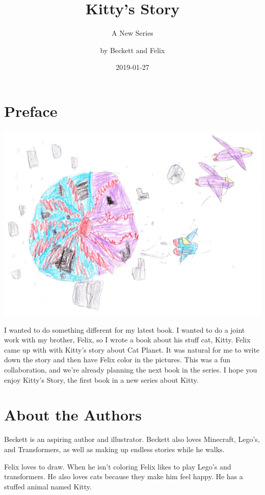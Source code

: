 \documentclass[12pt,oneside]{krantz}
\title{Kitty's Story}
\subtitle{A New Series}
\author{by Beckett and Felix}
\date{2019-01-27}
\begin{document}
\maketitle

{
\setcounter{tocdepth}{1}
\tableofcontents
}
\hypertarget{preface}{%
\chapter*{Preface}\label{preface}}


\includegraphics{img/catplanet.jpg}

I wanted to do something different for my latest book. I wanted to do a
joint work with my brother, Felix, so I wrote a book about his stuff
cat, Kitty. Felix came up with with Kitty's story about Cat Planet. It
was natural for me to write down the story and then have Felix color in
the pictures. This was a fun collaboration, and we're already planning
the next book in the series. I hope you enjoy Kitty's Story, the first
book in a new series about Kitty.

\hypertarget{about-the-authors}{%
\chapter*{About the Authors}\label{about-the-authors}}


Beckett is an aspiring author and illustrator. Beckett also loves
Minecraft, Lego's, and Transformers, as well as making up endless
stories while he walks.

Felix loves to draw. When he isn't coloring Felix likes to play Lego's
and transformers. He also loves cats because they make him feel happy.
He has a stuffed animal named Kitty.
\end{document}
